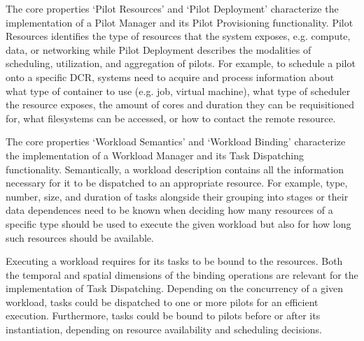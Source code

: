 \documentclass{sig-alternate}
\begin{document}
The core properties `Pilot Resources' and `Pilot Deployment' characterize the
implementation of a Pilot Manager and its Pilot Provisioning functionality.
Pilot Resources identifies the type of resources that the \pilot system exposes,
e.g. compute, data, or networking while Pilot Deployment describes the
modalities of scheduling, utilization, and aggregation of pilots. For example,
to schedule a pilot onto a specific DCR, \pilot systems need to acquire and
process information about what type of container to use (e.g. job, virtual
machine), what type of scheduler the resource exposes, the amount of cores and
duration they can be requisitioned for, what filesystems can be accessed, or how
to contact the remote resource.



The core properties `Workload Semantics' and `Workload Binding' characterize the
implementation of a Workload Manager and its Task Dispatching functionality.
Semantically, a workload description contains all the information necessary for
it to be dispatched to an appropriate resource.  For example, type, number,
size, and duration of tasks alongside their grouping into stages or their data
dependences need to be known when deciding how many resources of a specific type
should be used to execute the given workload but also for how long such
resources should be available.

Executing a workload requires for its tasks to be bound to the resources. Both
the temporal and spatial dimensions of the binding operations are relevant for
the implementation of Task Dispatching. Depending on the concurrency of a given
workload, tasks could be dispatched to one or more pilots for an efficient
execution. Furthermore, tasks could be bound to pilots before or after its
instantiation, depending on resource availability and scheduling decisions.
\end{document}
